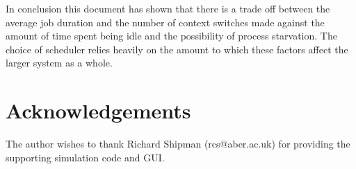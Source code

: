 \documentclass{acm_proc_article-sp}
\begin{document}
In conclusion this document has shown that there is a trade off between the average job duration and the number of context switches made against the amount of time spent being idle and the possibility of process starvation. The choice of scheduler relies heavily on the amount to which these factors affect the larger system as a whole.

\section{Acknowledgements}
The author wishes to thank Richard Shipman (rcs@aber.ac.uk) for providing the supporting simulation code and GUI.



\nocite{*}

\balancecolumns
\end{document}
